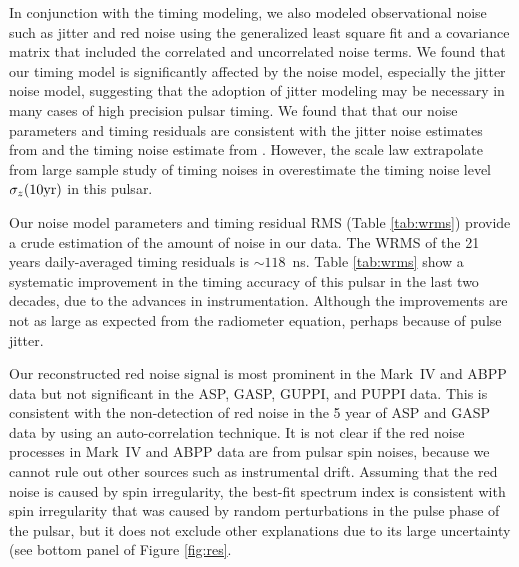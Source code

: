 In conjunction with the timing modeling, we also modeled observational noise
such as jitter and red noise
 using the generalized least square fit and a covariance matrix that included the
correlated and uncorrelated noise terms.
We found that our timing model is significantly affected by the noise
model, especially the jitter noise model, suggesting that the adoption of jitter
modeling may be necessary in many cases of high precision pulsar timing. 
We found that that our noise parameters and timing residuals are consistent with the jitter
noise estimates from \citet{sc12} and the timing noise estimate from \citet{sc10}. However,
the scale law extrapolate from large sample study of timing noises in \citet{hlk10}
overestimate the timing noise level $\sigma_z({\rm 10 yr})$ in this pulsar.

Our noise model parameters and timing residual RMS (Table \ref{tab:wrms})
provide a crude estimation of the amount of noise in our data. The WRMS of
the 21 years daily-averaged timing residuals is $\sim 118$~ns. 
Table \ref{tab:wrms} show a systematic improvement in the timing accuracy of
this pulsar in the last two decades, due to the advances in instrumentation.
Although the improvements are not as large as expected from the radiometer 
equation, perhaps because of pulse jitter. 

Our reconstructed red noise signal is most prominent in the Mark~IV and ABPP data
but not significant in the ASP, GASP, GUPPI, and PUPPI data.
This is consistent with the non-detection of red noise in the 5 year 
of ASP and GASP data by \citet{pjl+13} using an auto-correlation technique.
It is not clear if the red noise processes in Mark~IV and ABPP data
are from pulsar spin noises, because we cannot rule out other sources such as
instrumental drift.
Assuming that the red noise is caused by spin irregularity,
the best-fit spectrum index is consistent with
spin irregularity that was caused by random perturbations in
the pulse phase of the pulsar, but it does not exclude other explanations
due to its large uncertainty (see bottom panel of Figure \ref{fig:res}.



